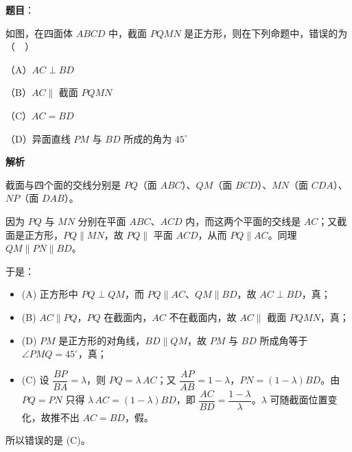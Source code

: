 \begin{answer}

\textbf{题目}：

如图，在四面体 $ABCD$ 中，截面 $PQMN$ 是正方形，则在下列命题中，错误的为（　）

（A）$AC\perp BD$

（B）$AC\parallel$ 截面 $PQMN$

（C）$AC=BD$

（D）异面直线 $PM$ 与 $BD$ 所成的角为 $45^\circ$
\nopagebreak[4]
\begin{center}\end{center}
\nopagebreak[4]
\textbf{解析}

截面与四个面的交线分别是 $PQ$（面 $ABC$）、$QM$（面 $BCD$）、$MN$（面 $CDA$）、$NP$（面 $DAB$）。

因为 $PQ$ 与 $MN$ 分别在平面 $ABC$、$ACD$ 内，而这两个平面的交线是 $AC$；又截面是正方形，$PQ\parallel MN$，故 $PQ\parallel$ 平面 $ACD$，从而 $PQ\parallel AC$。同理 $QM\parallel PN\parallel BD$。

于是：

\begin{itemize}
\item (A) 正方形中 $PQ\perp QM$，而 $PQ\parallel AC$、$QM\parallel BD$，故 $AC\perp BD$，真；
\item (B) $AC\parallel PQ$，$PQ$ 在截面内，$AC$ 不在截面内，故 $AC\parallel$ 截面 $PQMN$，真；
\item (D) $PM$ 是正方形的对角线，$BD\parallel QM$，故 $PM$ 与 $BD$ 所成角等于 $\angle PMQ=45^\circ$，真；
\item (C) 设 $\dfrac{BP}{BA}=\lambda$，则 $PQ=\lambda\,AC$；又 $\dfrac{AP}{AB}=1-\lambda$，$PN=(1-\lambda)BD$。由 $PQ=PN$ 只得 $\lambda\,AC=(1-\lambda)BD$，即 $\dfrac{AC}{BD}=\dfrac{1-\lambda}{\lambda}$。$\lambda$ 可随截面位置变化，故推不出 $AC=BD$，假。
\end{itemize}

所以错误的是 (C)。


\end{answer}
